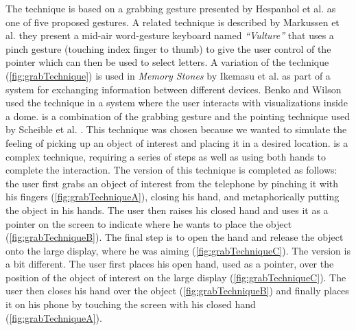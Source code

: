 The \grab technique is based on a grabbing gesture presented by Hespanhol et al. \cite{Hespanhol:2012} as one of five proposed gestures.
A related technique is described by Markussen et al. \cite{Markussen:2014} they present a mid-air word-gesture keyboard named \emph{``Vulture''} that uses a pinch gesture (touching index finger to thumb) to give the user control of the pointer which can then be used to select letters.
A variation of the \grab technique (\cref{fig:grabTechnique}) is used in \emph{Memory Stones} \cite{Ikematsu:2015} by Ikemasu et al. as part of a system for exchanging information between different devices. Benko and Wilson \cite{Benko:2010} used the \grab technique in a system where the user interacts with visualizations inside a dome. \grab is a combination of the grabbing gesture and the pointing technique used by Scheible et al. \cite{Scheible:2008}.
This technique was chosen because we wanted to simulate the feeling of picking up an object of interest and placing it in a desired location.
\grab is a complex technique, requiring a series of steps as well as using both hands to complete the interaction.
The \push version of this technique is completed as follows: the user first grabs an object of interest from the telephone by pinching it with his fingers (\cref{fig:grabTechniqueA}), closing his hand, and metaphorically putting the object in his hands.
The user then raises his closed hand and uses it as a pointer on the screen to indicate where he wants to place the object (\cref{fig:grabTechniqueB}).
The final step is to open the hand and release the object onto the large display, where he was aiming (\cref{fig:grabTechniqueC}).
The \pull version is a bit different.
The user first places his open hand, used as a pointer, over the position of the object of interest on the large display (\cref{fig:grabTechniqueC}).
The user then closes his hand over the object (\cref{fig:grabTechniqueB}) and finally places it on his phone by touching the screen with his closed hand (\cref{fig:grabTechniqueA}).  


